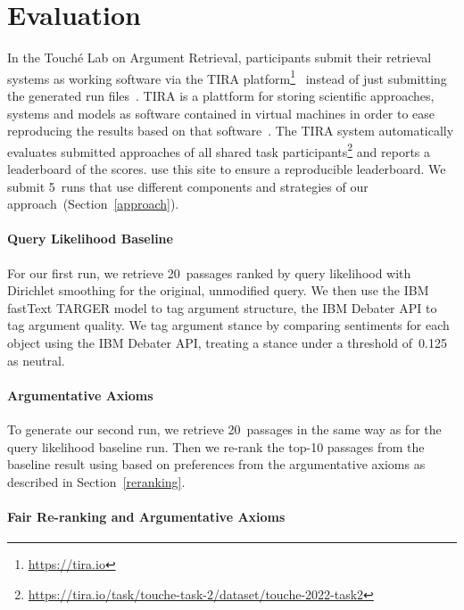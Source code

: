 \section{Evaluation}
\label{evaluation}

In the Touché Lab on Argument Retrieval, participants submit their retrieval systems as working software via the TIRA platform\footnote{\url{https://tira.io}}~\cite{PotthastGWS2019} instead of just submitting the generated run files~\cite{BondarenkoFKSGBPBSWPH2022}.
TIRA is a plattform for storing scientific approaches, systems and models as software contained in virtual machines in order to ease reproducing the results based on that software~\cite{PotthastGWS2019}.
The TIRA system automatically evaluates submitted approaches of all shared task participants\footnote{\url{https://tira.io/task/touche-task-2/dataset/touche-2022-task2}} and reports a leaderboard of the  scores.
\citet{BondarenkoFKSGBPBSWPH2022} use this site to ensure a reproducible leaderboard.
We submit 5~runs that use different components and strategies of our approach~(Section~\ref{approach}).

\paragraph{Query Likelihood Baseline}

For our first run, we retrieve 20~passages ranked by query likelihood with Dirichlet smoothing for the original, unmodified query. We then use the IBM fastText TARGER model to tag argument structure,
the IBM Debater API to tag argument quality.
We tag argument stance by comparing sentiments for each object using the IBM Debater API, treating a stance under a threshold of~0.125 as neutral.

\paragraph{Argumentative Axioms}

To generate our second run, we retrieve 20~passages in the same way as for the query likelihood baseline run. Then we re-rank the top-10 passages from the baseline result using \KwikSort based on preferences from the argumentative axioms as described in Section~\ref{reranking}.

\paragraph{Fair Re-ranking and Argumentative Axioms}

